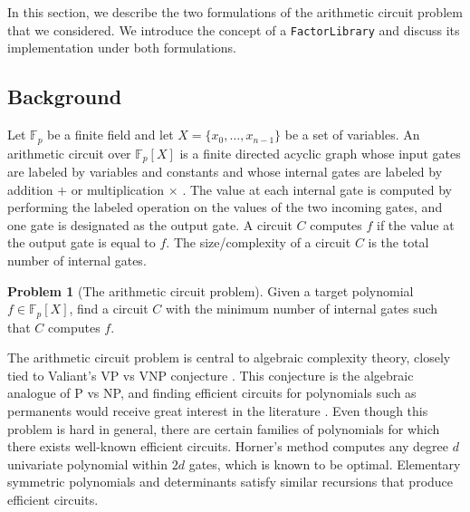 \documentclass{article}
\theoremstyle{definition}
\newtheorem{problem}[definition]{Problem}
\theoremstyle{remark}
\begin{document}
In this section, we describe the two formulations of the arithmetic circuit problem that we considered. We introduce the concept of a \texttt{FactorLibrary} and discuss its implementation under both formulations.

\subsection{Background}
\label{subsec:background}


Let $\mathbb{F}_p$ be a finite field and let $X=\{x_0,\ldots,x_{n-1}\}$ be a set of variables. An arithmetic circuit over $\mathbb{F}_p[X]$ is a finite directed acyclic graph whose input gates are labeled by variables and constants and whose internal gates are labeled by addition $+$ or multiplication $\times$ \citep{Burgisser1997AlgebraicComplexity,ShpilkaYehudayoff2009Circuits}. The value at each internal gate is computed by performing the labeled operation on the values of the two incoming gates, and one gate is designated as the output gate. A circuit $C$ computes $f$ if the value at the output gate is equal to $f$. The size/complexity of a circuit $C$ is the total number of internal gates.

\begin{problem}[The arithmetic circuit problem]
Given a target polynomial $f\in\mathbb{F}_p[X]$, find a circuit $C$ with the minimum number of internal gates such that $C$ computes $f$.
\end{problem}

The arithmetic circuit problem is central to algebraic complexity theory, closely tied to Valiant's VP vs VNP conjecture \citep{Valiant1979CompletenessClasses}. This conjecture is the algebraic analogue of P vs NP, and finding efficient circuits for polynomials such as permanents would receive great interest in the literature \citep{Valiant1979Permanent}. Even though this problem is hard in general, there are certain families of polynomials for which there exists well-known efficient circuits. Horner's method \citep{Horner1819NewMethod} computes any degree $d$ univariate polynomial within $2d$ gates, which is known to be optimal. Elementary symmetric polynomials and determinants satisfy similar recursions that produce efficient circuits.
\end{document}
